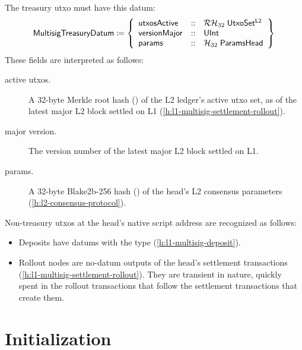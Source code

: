 \documentclass[../hydrozoa.tex]{subfiles}
\begin{document}
The treasury utxo must have this datum:
\begin{equation*}
  \mathsf{MultisigTreasuryDatum} \coloneq \left\{
    \begin{array}{lll}
      \mathsf{utxosActive}  &::& \mathcal{RH}_{32} \; \mathsf{UtxoSet^{L2}} \\
      \mathsf{versionMajor} &::& \mathsf{UInt} \\
      \mathsf{params} &::& \mathcal{H}_{32} \; \mathsf{ParamsHead}
    \end{array}\right\}
\end{equation*}
These fields are interpreted as follows:
\begin{description}
  \item[active utxos.] A 32-byte Merkle root hash () of the L2 ledger's active utxo set, as of the latest major L2 block settled on L1 (\cref{h:l1-multisig-settlement-rollout}).
  \item[major version.] The version number of the latest major L2 block settled on L1.
  \item[params.] A 32-byte Blake2b-256 hash () of the head's L2 consensus parameters (\cref{h:l2-consensus-protocol}).
\end{description}

Non-treasury utxos at the head's native script address are recognized as follows:
\begin{itemize}
  \item Deposits have datums with the  type (\cref{h:l1-multisig-deposit}).
  \item Rollout nodes are no-datum outputs of the head's settlement transactions (\cref{h:l1-multisig-settlement-rollout}).
    They are transient in nature, quickly spent in the rollout transactions that follow the settlement transactions that create them.
\end{itemize}
  
\section{Initialization}%
\label{h:l1-multisig-initialization}%
\end{document}
